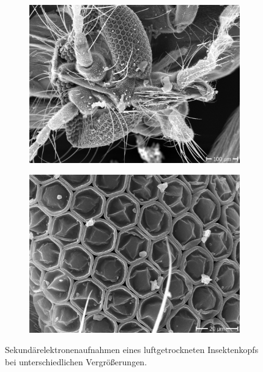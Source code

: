 \begin{figure}[!ht]
    \centering
    \begin{subfigure}{0.465\textwidth}
        \centering
        \includegraphics[width=1.1\textwidth]{img/SEM/10.9.20 9_08_08_Mag_ 180x_SE_insect_.jpg}
    \caption{}
    \end{subfigure}
    \hfill
    \begin{subfigure}{0.465\textwidth}
        \centering
        \includegraphics[width=1.1\textwidth]{img/SEM/10.9.20 9_11_43_Mag_ 1200x_SE_insect_eye_drying_artififact.jpg}
        \caption{}
    \end{subfigure}
    \caption{Sekundärelektronenaufnahmen eines luftgetrockneten Insektenkopfs bei unterschiedlichen Vergrößerungen.}
      \label{fig:insekt_implosion}
\end{figure}

